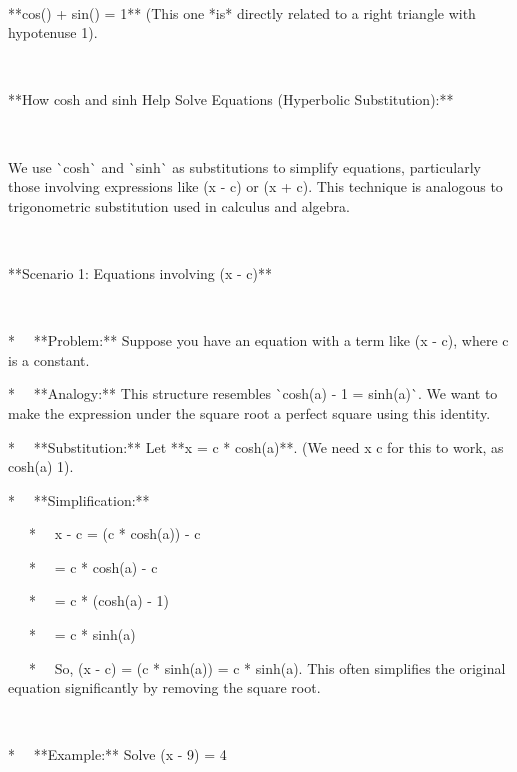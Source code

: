 \documentclass{article}
\newcommand{\nonconverted}[1]{\mbox{}}
\begin{document}
\

**cos{\texttwosuperior}({\theta}) + sin{\texttwosuperior}({\theta}) = 1**
(This one *is* directly related to a right triangle with hypotenuse 1).

\

**How cosh and sinh Help Solve Equations (Hyperbolic Substitution):**

\

We use \`{}cosh\`{} and \`{}sinh\`{} as substitutions to simplify equations,
particularly those involving expressions like  \nonconverted{sqrt}
(x{\texttwosuperior} - c{\texttwosuperior}) or  \nonconverted{sqrt}
(x{\texttwosuperior} + c{\texttwosuperior}). This technique is analogous to
trigonometric substitution used in calculus and algebra.

\

**Scenario 1: Equations involving  \nonconverted{sqrt} (x{\texttwosuperior} -
c{\texttwosuperior})**

\

* \ \ **Problem:** Suppose you have an equation with a term like 
\nonconverted{sqrt} (x{\texttwosuperior} - c{\texttwosuperior}), where c is a
constant.

* \ \ **Analogy:** This structure resembles \`{}cosh{\texttwosuperior}(a) - 1
= sinh{\texttwosuperior}(a)\`{}. We want to make the expression under the
square root a perfect square using this identity.

* \ \ **Substitution:** Let **x = c * cosh(a)**. (We need x {\geq} c for this
to work, as cosh(a) {\geq} 1).

* \ \ **Simplification:**

\ \ \ * \ \ x{\texttwosuperior} - c{\texttwosuperior} = (c *
cosh(a)){\texttwosuperior} - c{\texttwosuperior}

\ \ \ * \ \ = c{\texttwosuperior} * cosh{\texttwosuperior}(a) -
c{\texttwosuperior}

\ \ \ * \ \ = c{\texttwosuperior} * (cosh{\texttwosuperior}(a) - 1)

\ \ \ * \ \ = c{\texttwosuperior} * sinh{\texttwosuperior}(a)

\ \ \ * \ \ So,  \nonconverted{sqrt} (x{\texttwosuperior} -
c{\texttwosuperior}) =  \nonconverted{sqrt} (c{\texttwosuperior} *
sinh{\texttwosuperior}(a)) = \textbar c * sinh(a)\textbar . This often
simplifies the original equation significantly by removing the square root.

\

* \ \ **Example:** Solve  \nonconverted{sqrt} (x{\texttwosuperior} - 9) = 4
\end{document}
